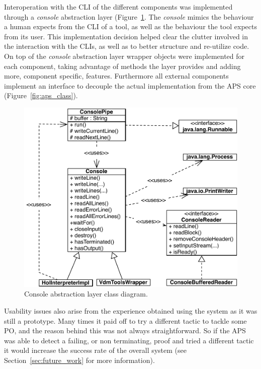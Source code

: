 \documentclass[]{article}
\begin{document}
Interoperation with the CLI of the different components was implemented through a \emph{console} abstraction layer (Figure~\ref{fig:aps_console_class}.
The \emph{console} mimics the behaviour a human expects from the CLI of a tool, as well as the behaviour the tool expects from its user.
This implementation decision helped clear the clutter involved in the interaction with the CLIs, as well as to better structure and re-utilize code.
On top of the \emph{console} abstraction layer wrapper objects were implemented for each component, taking advantage of methods the layer provides and adding more, component specific, features.
Furthermore all external components implement an interface to decouple the actual implementation from the APS core (Figure~\ref{fig:aps_class}).

\begin{figure}
  \begin{center}
    \includegraphics[width=.8\textwidth]{images/aps_console_class_diagram.pdf}
    \caption[Console asbtraction class diagram]{Console abstraction layer class diagram.}
    \label{fig:aps_console_class}
  \end{center}
\end{figure}


Usability issues also arise from the experience obtained using the system as it was still a prototype.
Many times it paid off to try a different tactic to tackle some PO, and the reason behind this was not always straightforward.
So if the APS was able to detect a failing, or non terminating, proof and tried a different tactic it would increase the success rate of the overall system (see Section~\ref{sec:future_work} for more information).
\end{document}

